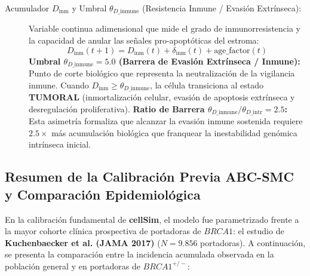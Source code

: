 \documentclass[10pt,a4paper]{article}
\begin{document}
\begin{description}
    \item[Acumulador $D_{\text{inm}}$ y Umbral $\theta_{D\text{\_inmune}}$ (Resistencia Inmune / Evasión Extrínseca):] Variable continua adimensional que mide el grado de inmunorresistencia y la capacidad de anular las señales pro-apoptóticas del estroma:
    \begin{equation}
        D_{\text{inm}}(t+1) = D_{\text{inm}}(t) + \delta_{\text{inm}}(t) + \text{age\_factor}(t)
    \end{equation}
    \textbf{Umbral $\theta_{D\text{\_inmune}} = 5.0$ (Barrera de Evasión Extrínseca / Inmune):} Punto de corte biológico que representa la neutralización de la vigilancia inmune. Cuando $D_{\text{inm}} \ge \theta_{D\text{\_inmune}}$, la célula transiciona al estado \textbf{TUMORAL} (inmortalización celular, evasión de apoptosis extrínseca y desregulación proliferativa).
    \textbf{Ratio de Barrera $\theta_{D\text{\_inmune}} / \theta_{D\text{\_intr}} = 2.5$:} Esta asimetría formaliza que alcanzar la evasión inmune sostenida requiere $2.5\times$ más acumulación biológica que franquear la inestabilidad genómica intrínseca inicial.
\end{description}

\subsection{Resumen de la Calibración Previa ABC-SMC y Comparación Epidemiológica}

En la calibración fundamental de \textbf{cellSim}, el modelo fue parametrizado frente a la mayor cohorte clínica prospectiva de portadoras de $BRCA1$: el estudio de \textbf{Kuchenbaecker et al. (JAMA 2017)} ($N=9.856$ portadoras). A continuación, se presenta la comparación entre la incidencia acumulada observada en la población general y en portadoras de $BRCA1^{+/-}$:
\end{document}

